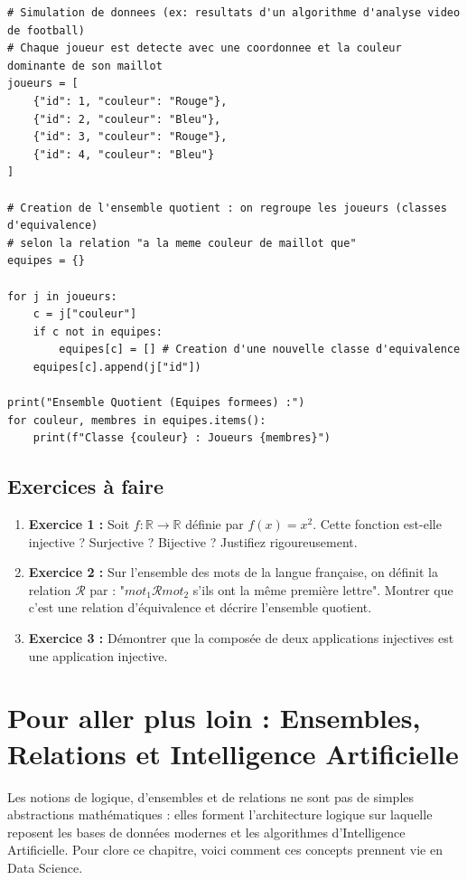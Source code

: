 \begin{lstlisting}
# Simulation de donnees (ex: resultats d'un algorithme d'analyse video de football)
# Chaque joueur est detecte avec une coordonnee et la couleur dominante de son maillot
joueurs = [
    {"id": 1, "couleur": "Rouge"},
    {"id": 2, "couleur": "Bleu"},
    {"id": 3, "couleur": "Rouge"},
    {"id": 4, "couleur": "Bleu"}
]

# Creation de l'ensemble quotient : on regroupe les joueurs (classes d'equivalence) 
# selon la relation "a la meme couleur de maillot que"
equipes = {}

for j in joueurs:
    c = j["couleur"]
    if c not in equipes:
        equipes[c] = [] # Creation d'une nouvelle classe d'equivalence
    equipes[c].append(j["id"])

print("Ensemble Quotient (Equipes formees) :")
for couleur, membres in equipes.items():
    print(f"Classe {couleur} : Joueurs {membres}")
\end{lstlisting}

\subsection{Exercices à faire}
\begin{enumerate}
    \item \textbf{Exercice 1 :} Soit $f : \mathbb{R} \to \mathbb{R}$ définie par $f(x) = x^2$. Cette fonction est-elle injective ? Surjective ? Bijective ? Justifiez rigoureusement.
    \item \textbf{Exercice 2 :} Sur l'ensemble des mots de la langue française, on définit la relation $\mathcal{R}$ par : "$mot_1 \mathcal{R} mot_2$ s'ils ont la même première lettre". Montrer que c'est une relation d'équivalence et décrire l'ensemble quotient.
    \item \textbf{Exercice 3 :} Démontrer que la composée de deux applications injectives est une application injective.
\end{enumerate}

\section*{Pour aller plus loin : Ensembles, Relations et Intelligence Artificielle}

Les notions de logique, d'ensembles et de relations ne sont pas de simples abstractions mathématiques : elles forment l'architecture logique sur laquelle reposent les bases de données modernes et les algorithmes d'Intelligence Artificielle. Pour clore ce chapitre, voici comment ces concepts prennent vie en Data Science.

